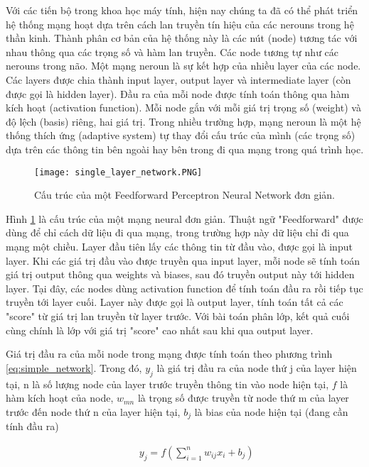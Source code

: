 Với các tiến bộ trong khoa học máy tính, hiện nay chúng ta đã có thể phát triển hệ thống mạng hoạt dựa trên cách lan truyền tín hiệu của các nerouns trong hệ thần kinh. Thành phân cơ bản của hệ thống này là các nút (node) tương tác với nhau thông qua các trọng số và hàm lan truyền. Các node tương tự như các nerouns trong não. Một mạng neroun là sự kết hợp của nhiều layer của các node. Các layers được chia thành input layer, output layer và intermediate layer (còn được gọi là hidden layer). Đầu ra của mỗi node được tính toán thông qua hàm kích hoạt (activation function). Mỗi node gắn với mỗi giá trị trọng số (weight) và độ lệch (basis) riêng, hai giá trị. Trong nhiều trường hợp, mạng neroun là một hệ thống thích ứng (adaptive system) tự thay đổi cấu trúc của mình (các trọng số) dựa trên các thông tin bên ngoài hay bên trong đi qua mạng trong quá trình học.

\begin{figure}[h!]
	\centering
	\captionsetup{width=0.7\textwidth}
	\texttt{[image: single\_layer\_network.PNG]}
	\caption{Cấu trúc của một Feedforward Perceptron Neural Network đơn giản.}
    \label{fig:simple_network}
\end{figure}

Hình \ref{fig:simple_network} là cấu trúc của một mạng neural đơn giản. Thuật ngữ "Feedforward" được dùng để chỉ cách dữ liệu đi qua mạng, trong trường hợp này dữ liệu chỉ đi qua mạng một chiều. Layer đầu tiên lấy các thông tin từ đầu vào, được gọi là input layer. Khi các giá trị đầu vào được truyền qua input layer, mỗi node sẽ tính toán giá trị output thông qua weights và biases, sau đó truyền output này tới hidden layer. Tại đây, các nodes dùng activation function để tính toán đầu ra rồi tiếp tục truyền tới layer cuối. Layer này được gọi là output layer, tính toán tất cả các "score" từ giá trị lan truyền từ layer trước. Với bài toán phân lớp, kết quả cuối cùng chính là lớp với giá trị "score" cao nhất sau khi qua output layer.

Giá trị đầu ra của mỗi node trong mạng được tính toán theo phương trình \ref{eq:simple_network}. Trong đó, $y_{j}$ là giá trị đầu ra của node thứ j của layer hiện tại, n là số lượng node của layer trước truyền thông tin vào node hiện tại, $f$ là hàm kích hoạt của node, $w_{mn}$ là trọng số được truyền từ node thứ m của layer trước đến node thứ n của layer hiện tại, $b_j$ là bias của node hiện tại (đang cần tính đầu ra)

\begin{eqnarray}
\label{eq:simple_network}
\hspace{1cm} y_{j} = f(\sum_{i=1}^{n} {w_{ij}x_i} + b_j)
\end{eqnarray}


